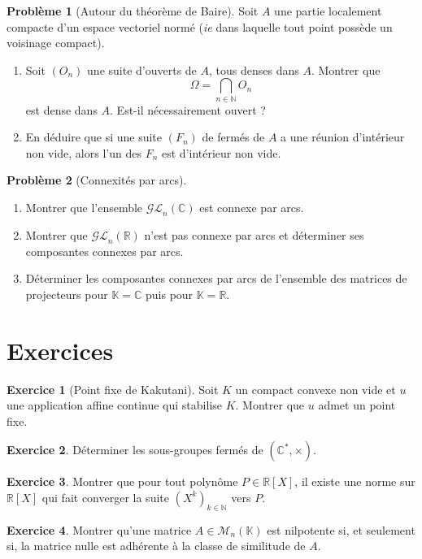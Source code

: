 \documentclass[french]{book}
\newcommand{\N}{\mathbb{N}}
\newcommand{\R}{\mathbb{R}}
\newcommand{\C}{\mathbb{C}}
\newcommand{\K}{\mathbb{K}}
\newcommand{\st}{^*}
\theoremstyle{definition}
\newtheorem{ex}{Exercice}[chapter]
\newtheorem{pro}{Problème}[chapter]
\begin{document}
\begin{pro}[Autour du théorème de Baire]
	Soit $A$ une partie localement compacte d'un espace vectoriel normé (\textit{ie} dans laquelle tout point possède un voisinage compact).
	\begin{enumerate}
		\item Soit $(O_n)$ une suite d'ouverts de $A$, tous denses dans $A$. Montrer que $$\Omega=\bigcap_{n\in\N} O_n$$ est dense dans $A$. Est-il nécessairement ouvert ?
		\item En déduire que si une suite $(F_n)$ de fermés de $A$ a une réunion d'intérieur non vide, alors l'un des $F_n$ est d'intérieur non vide.
	\end{enumerate}
\end{pro}

\begin{pro}[Connexités par arcs]
	\begin{enumerate}
		\item Montrer que l'ensemble $\mathcal{GL}_n(\C)$ est connexe par arcs.
		\item Montrer que $\mathcal{GL}_n(\R)$ n'est pas connexe par arcs et déterminer ses composantes connexes par arcs.
		\item Déterminer les composantes connexes par arcs de l'ensemble des matrices de projecteurs pour $\K=\C$ puis pour $\K=\R$.
	\end{enumerate}
\end{pro}

\section{Exercices}

\begin{ex}[Point fixe de Kakutani]
	Soit $K$ un compact convexe non vide et $u$ une application affine continue qui stabilise $K$. Montrer que $u$ admet un point fixe.
\end{ex}

\begin{ex}
	Déterminer les sous-groupes fermés de $(\C\st,\times)$.
\end{ex}

\begin{ex}
	Montrer que pour tout polynôme $P\in\R[X]$, il existe une norme sur $\R[X]$ qui fait converger la suite $(X^k)_{k\in\N}$ vers $P$.
\end{ex}

\begin{ex}
	Montrer qu'une matrice $A\in\mathcal{M}_n(\K)$ est nilpotente si, et seulement si, la matrice nulle est adhérente à la classe de similitude de $A$.
\end{ex}
\end{document}
